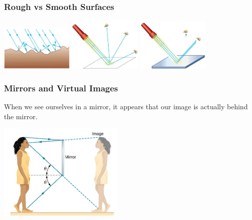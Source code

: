 \documentclass{beamer}
\begin{document}
\begin{frame}\frametitle{Rough vs Smooth Surfaces}

\begin{center}
\includegraphics[width=3.5cm]{fig/reflect_rough.png}
\includegraphics[width=3.5cm]{fig/reflect_paper.png}
\includegraphics[width=3.5cm]{fig/reflect_mirror.png}
\end{center}

\end{frame}

\begin{frame}\frametitle{Mirrors and Virtual Images}
When we see ourselves in a mirror, it appears that our image is actually behind the mirror.

\begin{center}
\includegraphics[width=6cm]{fig/virtual.png}
\end{center}

\end{frame}
\end{document}
